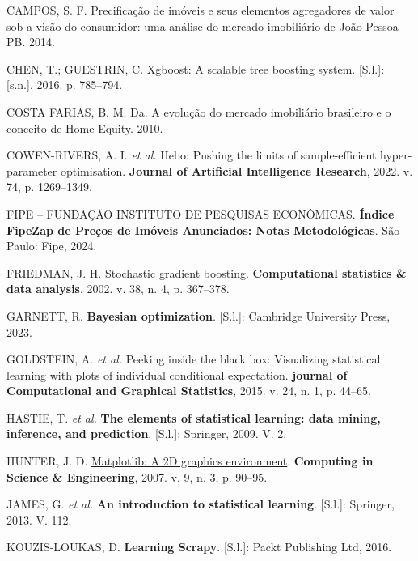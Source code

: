 \documentclass[
  12pt,
  a4paper,
]{scrreprt}
\newlength{\cslhangindent}
\newenvironment{CSLReferences}[2] %
 {\begin{list}{}{%
  \setlength{\itemindent}{0pt}
  \setlength{\leftmargin}{0pt}
  \setlength{\parsep}{0pt}
  \ifodd #1
   \setlength{\leftmargin}{\cslhangindent}
   \setlength{\itemindent}{-1\cslhangindent}
  \fi
  \setlength{\itemsep}{#2\baselineskip}}}
 {\end{list}}
\begin{document}
\begin{CSLReferences}{0}{1}
CAMPOS, S. F. Precifica{ç}{ã}o de im{ó}veis e seus elementos agregadores
de valor sob a vis{ã}o do consumidor: uma an{á}lise do mercado
imobili{á}rio de Jo{ã}o Pessoa-PB. 2014.

CHEN, T.; GUESTRIN, C. Xgboost: A scalable tree boosting system.
{[}S.l.{]}: {[}s.n.{]}, 2016. p. 785--794.

COSTA FARIAS, B. M. Da. A evolu{ç}{ã}o do mercado imobili{á}rio
brasileiro e o conceito de Home Equity. 2010.

COWEN-RIVERS, A. I. \emph{et al.} Hebo: Pushing the limits of
sample-efficient hyper-parameter optimisation. \textbf{Journal of
Artificial Intelligence Research}, 2022. v. 74, p. 1269--1349.

FIPE -- FUNDAÇÃO INSTITUTO DE PESQUISAS ECONÔMICAS. \textbf{Índice
FipeZap de Preços de Imóveis Anunciados: Notas Metodológicas}. São
Paulo: Fipe, 2024.

FRIEDMAN, J. H. Stochastic gradient boosting. \textbf{Computational
statistics \& data analysis}, 2002. v. 38, n. 4, p. 367--378.

GARNETT, R. \textbf{Bayesian optimization}. {[}S.l.{]}: Cambridge
University Press, 2023.

GOLDSTEIN, A. \emph{et al.} Peeking inside the black box: Visualizing
statistical learning with plots of individual conditional expectation.
\textbf{journal of Computational and Graphical Statistics}, 2015. v. 24,
n. 1, p. 44--65.

HASTIE, T. \emph{et al.} \textbf{The elements of statistical learning:
data mining, inference, and prediction}. {[}S.l.{]}: Springer, 2009. V.
2.

HUNTER, J. D. \href{https://doi.org/10.1109/MCSE.2007.55}{Matplotlib: A
2D graphics environment}. \textbf{Computing in Science \& Engineering},
2007. v. 9, n. 3, p. 90--95.

JAMES, G. \emph{et al.} \textbf{An introduction to statistical
learning}. {[}S.l.{]}: Springer, 2013. V. 112.

KOUZIS-LOUKAS, D. \textbf{Learning Scrapy}. {[}S.l.{]}: Packt Publishing
Ltd, 2016.


\end{CSLReferences}
\end{document}
